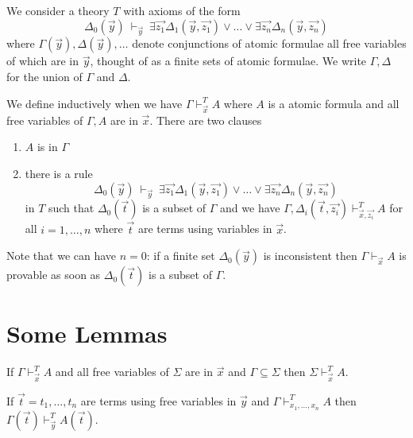\documentclass[10pt,a4paper]{article}
\begin{document}
\medskip

 We consider a theory $T$ with axioms of the form
$$
\Delta_0(\vec{y})~\vdash_{\vec{y}}~
\exists \vec{z_1}\Delta_1(\vec{y},\vec{z_1})\vee\dots\vee\exists \vec{z_n}\Delta_n(\vec{y},\vec{z_n})
$$
where $\Gamma(\vec{y}), \Delta(\vec{y}),\dots$ denote conjunctions of atomic formulae
all free variables of which are in $\vec{y}$, thought of as a finite sets of atomic formulae.
We write $\Gamma,\Delta$ for the union of $\Gamma$ and $\Delta$.

 We define inductively when we have $\Gamma\vdash_{\vec{x}}^T A$ where $A$ is a atomic formula
and all free variables of $\Gamma,A$ are in $\vec{x}$. There are two clauses

\begin{enumerate}
\item $A$ is in $\Gamma$

\item there is a rule
$$
\Delta_0(\vec{y})~\vdash_{\vec{y}}~
\exists \vec{z_1}\Delta_1(\vec{y},\vec{z_1})\vee\dots\vee\exists \vec{z_n}\Delta_n(\vec{y},\vec{z_n})
$$
in $T$ such that $\Delta_0(\vec{t})$ is a subset of $\Gamma$ and
we have $\Gamma,\Delta_i(\vec{t},\vec{z_i})\vdash^T_{\vec{x},\vec{z_i}} A$ for all $i = 1,\dots,n$
where $\vec{t}$ are terms using variables in $\vec{x}$.
\end{enumerate}

 Note that we can have $n=0$: if a finite set $\Delta_0(\vec{y})$ is inconsistent
then $\Gamma\vdash_{\vec{x}} A$ is provable as soon as $\Delta_0(\vec{t})$ is a subset of $\Gamma$.


\section{Some Lemmas}


\begin{lemma}\label{weak}
If $\Gamma\vdash_{\vec{x}}^T A$ and all free variables of $\Sigma$ are in $\vec{x}$ and
$\Gamma\subseteq \Sigma$ then $\Sigma\vdash_{\vec{x}}^T A$.
\end{lemma}

\begin{lemma}\label{subst1}
If $\vec{t} = t_1,\dots,t_n$ are terms using free variables in $\vec{y}$ and
$\Gamma\vdash_{x_1,\dots,x_n}^T A$ then $\Gamma(\vec{t})\vdash_{\vec{y}}^T A(\vec{t})$.
\end{lemma}
\end{document}
